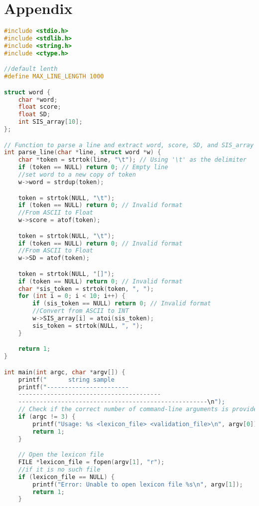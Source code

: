 \documentclass{article}
\begin{document}
\section{Appendix}
\begin{lstlisting}[language=C]
#include <stdio.h>
#include <stdlib.h>
#include <string.h>
#include <ctype.h>

//default lenth
#define MAX_LINE_LENGTH 1000

struct word {
    char *word;
    float score;
    float SD;
    int SIS_array[10];
};

// Function to parse a line and extract word, score, SD, and SIS_array
int parse_line(char *line, struct word *w) {
    char *token = strtok(line, "\t"); // Using '\t' as the delimiter
    if (token == NULL) return 0; // Empty line
    //set word to a new copy of token
    w->word = strdup(token);

    token = strtok(NULL, "\t");
    if (token == NULL) return 0; // Invalid format
    //From ASCII to Float
    w->score = atof(token);

    token = strtok(NULL, "\t");
    if (token == NULL) return 0; // Invalid format
    //From ASCII to Float
    w->SD = atof(token);

    token = strtok(NULL, "[]");
    if (token == NULL) return 0; // Invalid format
    char *sis_token = strtok(token, ", ");
    for (int i = 0; i < 10; i++) {
        if (sis_token == NULL) return 0; // Invalid format
        //Convert from ASCII to INT
        w->SIS_array[i] = atoi(sis_token);
        sis_token = strtok(NULL, ", ");
    }

    return 1;
}

int main(int argc, char *argv[]) {
    printf("      string sample                                                                                       score\n");
    printf("-----------------------
    ----------------------------------------
    -----------------------------------------------------\n");
    // Check if the correct number of command-line arguments is provided
    if (argc != 3) {
        printf("Usage: %s <lexicon_file> <validation_file>\n", argv[0]);
        return 1;
    }

    // Open the lexicon file
    FILE *lexicon_file = fopen(argv[1], "r");
    //if it is no such file
    if (lexicon_file == NULL) {
        printf("Error: Unable to open lexicon file %s\n", argv[1]);
        return 1;
    }


\end{lstlisting}
\end{document}
